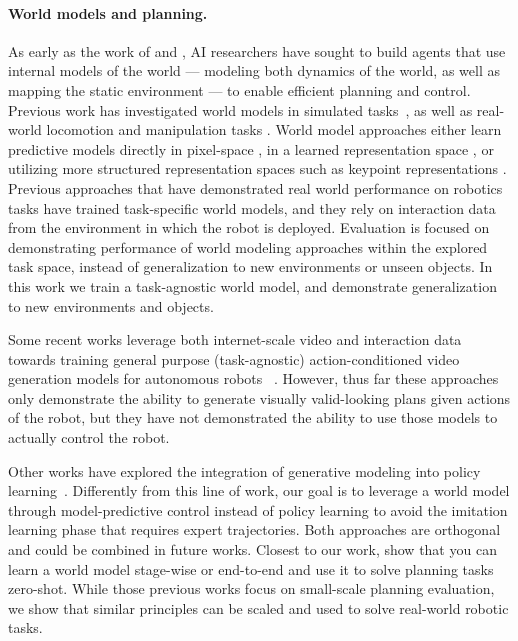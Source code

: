 \documentclass[]{fairmeta}
\begin{document}
\paragraph{\bf World models and planning.}
As early as the work of \citet{sutton1981adaptive} and \citet{chatila1985position}, AI researchers have sought to build agents that use internal models of the world --- modeling both dynamics of the world, as well as mapping the static environment --- to enable efficient planning and control. 
Previous work has investigated world models in simulated tasks~\citep{fragkiadaki2015learning,ha2018world,hafner2019learning,hafner2019dream,hansen2022temporal,hansen2023td,hafner2023mastering,schrittwieser2020mastering,samsami2024mastering}, as well as real-world locomotion and manipulation tasks \citep{lee2020learning, nagabandi2020deep, finn2016unsupervised, ebert2017self, ebert2018visual, yen2020experience}. World model approaches either learn predictive models directly in pixel-space \citep{finn2016unsupervised, ebert2017self, ebert2018visual, yen2020experience}, in a learned representation space \citep{watter2015embed, agrawal2016learning, ha2018world, hafner2019learning, nair2022r3m,wu2023daydreamer,tomar2024video,hu2024learning,lancaster2024modem}, or utilizing more structured representation spaces such as keypoint representations \citep{manuelli2020keypoints, das2020model}.
Previous approaches that have demonstrated real world performance on robotics tasks have trained task-specific world models, and they rely on interaction data from the environment in which the robot is deployed. Evaluation is focused on demonstrating performance of world modeling approaches within the explored task space, instead of generalization to new environments or unseen objects.
In this work we train a task-agnostic world model, and demonstrate generalization to new environments and objects.


Some recent works leverage both internet-scale video and interaction data towards training general purpose (task-agnostic) action-conditioned video generation models for autonomous robots ~\citep{bruce2024genie,agarwal2025cosmos,russell2025gaia}. However, thus far these approaches only demonstrate the ability to generate visually valid-looking plans given actions of the robot, but they have not demonstrated the ability to use those models to actually control the robot. 

Other works have explored the integration of generative modeling into policy learning~\citep{vlp2024,wu2023unleashing,zhao2025cot,zhu2025unified,du2023learning,zheng2025flare,rajasegaran2025empirical}. Differently from this line of work, our goal is to leverage a world model through model-predictive control instead of policy learning to avoid the imitation learning phase that requires expert trajectories. Both approaches are orthogonal and could be combined in future works. Closest to our work, \citet{zhou2024dino,sobal2025learning} show that you can learn a world model stage-wise or end-to-end and use it to solve planning tasks zero-shot. While those previous works focus on small-scale planning evaluation, we show that similar principles can be scaled and used to solve real-world robotic tasks.
\end{document}
